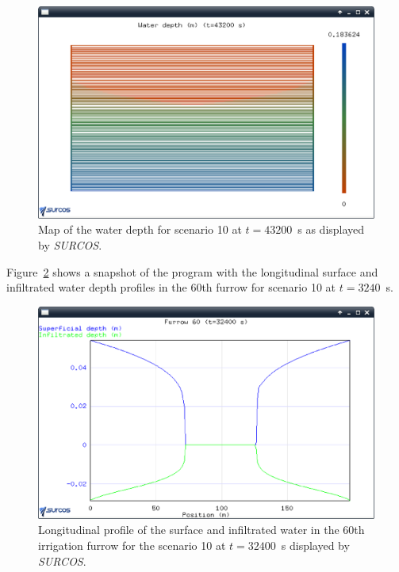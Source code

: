 \documentclass[review,authoryear]{elsarticle}
\begin{document}
\begin{figure}[!ht]
\begin{center}
\includegraphics[width=\textwidth]{evo1EN.eps}
\caption{Map of the water depth for scenario 10 at
$t=43200$~s as displayed by \emph{SURCOS}.}\label{evo1}
\end{center}
\end{figure}

Figure~\ref{evo2} shows a snapshot of the program with the longitudinal surface
and infiltrated water depth profiles in the 60th furrow for scenario 10 at
$t=3240$~s.

\begin{figure}[ht!]
\begin{center}
\includegraphics[width=\textwidth]{evoSurcoEN.eps}
\caption{Longitudinal profile of the surface and infiltrated
water in the 60th irrigation furrow for the scenario 10 at $t=32400$~s displayed by
\emph{SURCOS}.}\label{evo2}
\end{center}
\end{figure}
\end{document}
